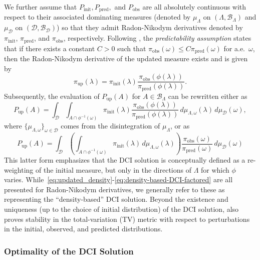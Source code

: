 \documentclass{article}
\newcommand{\B}{\mathcal{B}}
\newcommand{\pspace}{\Lambda}
\newcommand{\dspace}{\mathcal{D}}
\newcommand{\initmeas}{P_{\text{init}}}
\newcommand{\updatemeas}{P_{\text{up}}}
\newcommand{\initdens}{\pi_{\text{init}}}
\newcommand{\updatedens}{\pi_{\text{up}}}
\newcommand{\predictmeas}{P_\text{pred}}
\newcommand{\predictdens}{\pi_\text{pred}}
\newcommand{\obsmeas}{P_{\text{obs}}}
\newcommand{\obsdens}{\pi_{\text{obs}}}
\begin{document}
We further assume that $\initmeas, \predictmeas,$ and $\obsmeas$ are all absolutely continuous with respect to their associated dominating measures (denoted by $\mu_\Lambda$ on $(\Lambda,\B_\Lambda)$ and $\mu_\mathcal{D}$ on $(\mathcal{D}, \B_\mathcal{D})$) so that they admit Radon-Nikodym derivatives denoted by $\initdens$, $\predictdens$, and $\obsdens$, respectively.
Following \cite{BJW18a}, the {\em predictability assumption} states that if there exists a constant $C>0$ such that $\obsdens(\omega)\leq C\predictdens(\omega)$ for a.e.~$\omega$, then the Radon-Nikodym derivative of the updated measure exists and is given by
\begin{equation}\label{eq:updated_density}
    \updatedens(\lambda) = \initdens(\lambda)\frac{\obsdens(\phi(\lambda))}{\predictdens(\phi(\lambda))}.
\end{equation}
Subsequently, the evaluation of $\updatemeas(A)$ for $A\in\B_\Lambda$ can be rewritten either as
\begin{equation}\label{eq:density-based-DCI}
    \updatemeas(A) = \int_\mathcal{D} \int_{A\cap \phi^{-1}(\omega)} \initdens(\lambda)\frac{\obsdens(\phi(\lambda))}{\predictdens(\phi(\lambda))}\, d\mu_{\Lambda,\omega}(\lambda)\,  d\mu_\mathcal{D}(\omega),
\end{equation}
where $\{\mu_{\pspace,\omega}\}_{\omega\in\dspace}$ comes from the disintegration of $\mu_\pspace$, or as
\begin{equation}\label{eq:density-based-DCI-factored}
    \updatemeas(A) = \int_\mathcal{D} \left(\int_{A\cap \phi^{-1}(\omega)} \initdens(\lambda)\, d\mu_{\Lambda,\omega}(\lambda)\right) \frac{\obsdens(\omega)}{\predictdens(\omega)}\,  d\mu_\mathcal{D}(\omega)
\end{equation}
This latter form emphasizes that the DCI solution is conceptually defined as a re-weighting of the initial measure, but only in the directions of $\Lambda$ for which $\phi$ varies.
While~\eqref{eq:updated_density}-\eqref{eq:density-based-DCI-factored} are all presented for Radon-Nikodym derivatives, we generally refer to these as representing the ``density-based'' DCI solution.
Beyond the existence and uniqueness (up to the choice of initial distribution) of the DCI solution, \cite{BJW18a} also proves stability in the total-variation (TV) metric with respect to perturbations in the initial, observed, and predicted distributions.

\subsubsection{Optimality of the DCI Solution}\label{subsec:DCI+Optimality}
\end{document}
